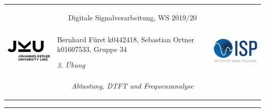 \documentclass[12pt,a4paper,austrian]{article}
\begin{document}
\pagestyle{plain}
  \thispagestyle{empty}
  \noindent
  \begin{minipage}[b][2.4cm]{1.0\textwidth}  
  \begin{tabular}{l p{11cm} r} 
    \multicolumn{3}{c}{\centering \begin{large}\begin{bf}
  	\textsf{Digitale Signalverarbeitung, WS 2019/20} \end{bf}\end{large} }  
  	 \\
  	\multirow{2}{*}{\includegraphics[height=1.6cm]{fig/JKU_Logo}} 
  	& \centering Bernhard Fürst k0442418, Sebastian Ortner k01607533, Gruppe 34 \vspace{1.3em}  &
    \multirow{2}{*}{\includegraphics[height=1.9cm]{fig/ISP-Logo-color-02}}  \\	
    & \centering \textit{3. Übung} & \\     
    \multicolumn{3}{c}{\centering \begin{large}
    \textit{Abtastung, DTFT und Frequenzanalyse}%
    \end{large} }  
 
  \end{tabular} 
  \end{minipage}

  \noindent \rule[0.8em]{\textwidth}{0.12mm}\\[-0.5em]

\end{document}
